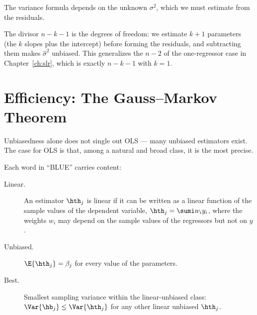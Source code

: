 The variance formula depends on the unknown $\sigma^2$, which we must estimate from the residuals.


The divisor $n-k-1$ is the degrees of freedom: we estimate $k+1$ parameters (the $k$ slopes plus the intercept) before forming the residuals, and subtracting them makes $\widehat\sigma^2$ unbiased. This generalizes the $n-2$ of the one-regressor case in Chapter~\ref{ch:slr}, which is exactly $n-k-1$ with $k=1$.

\section{Efficiency: The Gauss--Markov Theorem}

Unbiasedness alone does not single out OLS --- many unbiased estimators exist. The case for OLS is that, among a natural and broad class, it is the most precise.


Each word in ``BLUE'' carries content:
\begin{description}
    \item[Linear.] An estimator $\hth_j$ is linear if it can be written as a linear function of the sample values of the dependent variable, $\hth_j = \sumi w_i y_i$, where the weights $w_i$ may depend on the sample values of the regressors but not on $y$.
    \item[Unbiased.] $\E{\hth_j} = \beta_j$ for every value of the parameters.
    \item[Best.] Smallest sampling variance within the linear-unbiased class: $\Var{\hb_j} \le \Var{\hth_j}$ for any other linear unbiased $\hth_j$.
\end{description}

